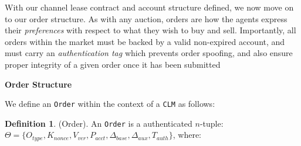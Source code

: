 \documentclass[12pt,a4paper]{article}
\theoremstyle{definition}
\newtheorem{definition}{Definition}[section]
\begin{document}
With our channel lease contract and account structure defined, we now move on
to our order structure. As with any auction, orders are how the agents express
their \emph{preferences} with respect to what they wish to buy and sell.
Importantly, all orders within the market must be backed by a valid non-expired
account, and must carry an \emph{authentication tag} which prevents order
spoofing, and also ensure proper integrity of a given order once it has been
submitted

\begin{center}
\textbf{Order Structure}
\end{center}

We define an \texttt{Order} within the context of a \texttt{CLM} as follows: 

\theoremstyle{definition}
\begin{definition}{(Order).}
    An \texttt{Order} is a authenticated $n$-tuple: \\ $\Theta = \{O_{type}, K_{nonce},
    V_{ver}, P_{acct}, \Delta_{base}, \Delta_{aux}, T_{auth} \} $, where:

\end{definition}
\end{document}
